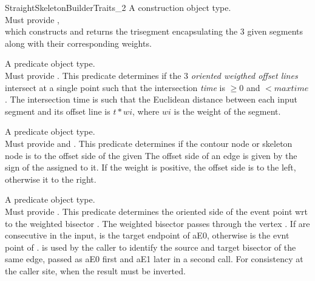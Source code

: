 \begin{ccRefConcept}{StraightSkeletonBuilderTraits_2}
{A construction object type.\\
Must provide , \\
which constructs and returns the trisegment encapsulating the 3 given segments along with their corresponding weights.}

{A predicate object type.\\
Must provide . 
This predicate determines if the 3 \textit{oriented weigthed offset lines} intersect at a single point such that the intersection \textit{time}  is $\geq 0$ and $\lt maxtime$.
The intersection time  is such that the Euclidean distance between each input segment and its offset line is $t*wi$, where $wi$ is the weight of the segment.\\
}

{A predicate object type.\\
Must provide 
and .
This predicate determines if the contour node  or skeleton node  is to the offset side of the given 
The offset side of an edge is given by the sign of the  assigned to it. If the weight is positive, the offset side is to the left, otherwise it to the right.
}

{A predicate object type.\\
Must provide .
This predicate determines the oriented side of the event point wrt to the weighted bisector \ccc{[aE0,aW0,aE0,aW1]}.
The weighted bisector passes through the vertex . If \ccc{[aE0,aE0]} are consecutive in the input,  is the target endpoint of aE0,
otherwise is the evnt point of .
 is used by the caller to identify the source and target bisector of the same edge, passed as aE0 first and aE1 later in a second call.
For consistency at the caller site, when  the result must be inverted.
}


\end{ccRefConcept}
